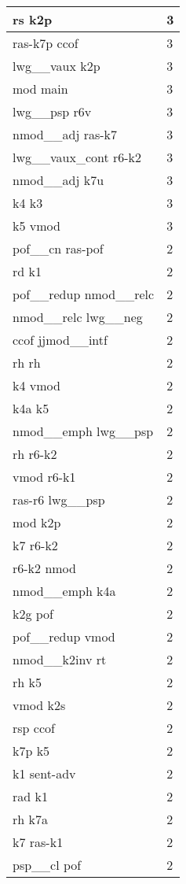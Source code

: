 \documentclass[a4 paper]{article}
\begin{document}
\begin{longtable}{p{}p{}}
rs k2p  & 3 \\ \midrule
ras-k7p ccof  & 3 \\ \midrule
lwg\_\_vaux k2p  & 3 \\ \midrule
mod main  & 3 \\ \midrule
lwg\_\_psp r6v  & 3 \\ \midrule
nmod\_\_adj ras-k7  & 3 \\ \midrule
lwg\_\_vaux\_cont r6-k2  & 3 \\ \midrule
nmod\_\_adj k7u  & 3 \\ \midrule
k4 k3  & 3 \\ \midrule
k5 vmod  & 3 \\ \midrule
pof\_\_cn ras-pof  & 2 \\ \midrule
rd k1  & 2 \\ \midrule
pof\_\_redup nmod\_\_relc  & 2 \\ \midrule
nmod\_\_relc lwg\_\_neg  & 2 \\ \midrule
ccof jjmod\_\_intf  & 2 \\ \midrule
rh rh  & 2 \\ \midrule
k4 vmod  & 2 \\ \midrule
k4a k5  & 2 \\ \midrule
nmod\_\_emph lwg\_\_psp  & 2 \\ \midrule
rh r6-k2  & 2 \\ \midrule
vmod r6-k1  & 2 \\ \midrule
ras-r6 lwg\_\_psp  & 2 \\ \midrule
mod k2p  & 2 \\ \midrule
k7 r6-k2  & 2 \\ \midrule
r6-k2 nmod  & 2 \\ \midrule
nmod\_\_emph k4a  & 2 \\ \midrule
k2g pof  & 2 \\ \midrule
pof\_\_redup vmod  & 2 \\ \midrule
nmod\_\_k2inv rt  & 2 \\ \midrule
rh k5  & 2 \\ \midrule
vmod k2s  & 2 \\ \midrule
rsp ccof  & 2 \\ \midrule
k7p k5  & 2 \\ \midrule
k1 sent-adv  & 2 \\ \midrule
rad k1  & 2 \\ \midrule
rh k7a  & 2 \\ \midrule
k7 ras-k1  & 2 \\ \midrule
psp\_\_cl pof  & 2 \\ \midrule

\end{longtable}
\end{document}
